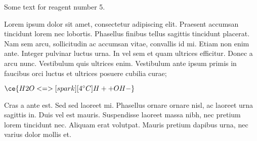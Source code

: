
Some text for reagent number 5.

Lorem ipsum dolor sit amet, consectetur adipiscing elit. Praesent accumsan tincidunt lorem nec lobortis. Phasellus finibus tellus sagittis tincidunt placerat. Nam sem arcu, sollicitudin ac accumsan vitae, convallis id mi. Etiam non enim ante. Integer pulvinar luctus urna. In vel sem et quam ultrices efficitur. Donec a arcu nunc. Vestibulum quis ultrices enim. Vestibulum ante ipsum primis in faucibus orci luctus et ultrices posuere cubilia curae;

$\ce{H2O <=>[spark][4^\circ C] H+ + OH-}$

Cras a ante est. Sed sed laoreet mi. Phasellus ornare ornare nisl, ac laoreet urna sagittis in. Duis vel est mauris. Suspendisse laoreet massa nibh, nec pretium lorem tincidunt nec. Aliquam erat volutpat. Mauris pretium dapibus urna, nec varius dolor mollis et.
